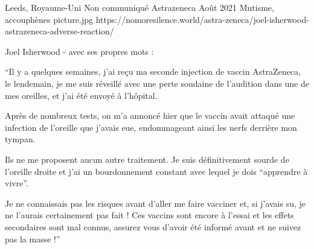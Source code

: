 {Leeds, Royaume-Uni}
{Non communiqué}
{Astrazeneca}
{Août 2021}
{Mutisme, accouphènes}
{picture.jpg}
{https://nomoresilence.world/astra-zeneca/joel-isherwood-astrazeneca-adverse-reaction/}
{

Joel Isherwood - avec ses propres mots :

“Il y a quelques semaines, j'ai reçu ma seconde injection de vaccin AstraZeneca,
le lendemain, je me suis réveillé avec une perte soudaine de l'audition dans une
de mes oreilles, et j'ai été envoyé à l'hôpital.

Après de nombreux tests, on m'a annoncé hier que le vaccin avait attaqué une
infection de l'oreille que j'avais eue, endommageant ainsi les nerfs derrière
mon tympan.

Ils ne me proposent aucun autre traitement. Je suis définitivement sourde de
l'oreille droite et j'ai un bourdonnement constant avec lequel je dois
“apprendre à vivre”.

Je ne connaissais pas les risques avant d'aller me faire vacciner et, si j'avais
su, je ne l'aurais certainement pas fait ! Ces vaccins sont encore à l'essai et
les effets secondaires sont mal connus, assurez vous d'avoir été informé avant
et ne suivez pas la masse !”

}
